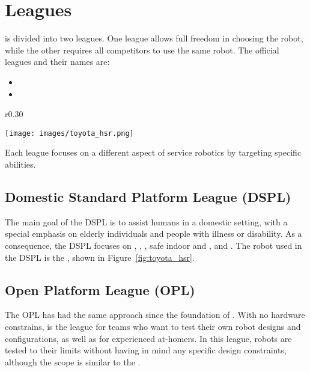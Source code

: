 \section{Leagues}\label{sec:leagues}

\AtHome{} is divided into two leagues. One league allows full freedom in choosing the robot, while the other requires all competitors to use the same robot. The official leagues and their names are:
\begin{itemize}
  \item \OPL
  \item \DSPL
\end{itemize}

\begin{wrapfigure}[21]{r}{0.30\textwidth}
	\vspace{-30pt}
	\begin{center}
		\texttt{[image: images/toyota\_hsr.png]}
		\vspace{-10pt}
		\caption{Toyota HSR}
		\label{fig:toyota_hsr}
	\end{center}
\end{wrapfigure}
Each league focuses on a different aspect of service robotics by targeting specific abilities.

\subsection{Domestic Standard Platform League (DSPL)}

The main goal of the DSPL is to assist humans in a domestic setting, with a special emphasis on elderly individuals and people with illness or disability.
As a consequence, the DSPL focuses on \AmI{}, \CV{}, \OM{}, safe indoor \NAV{} and \MAP{}, and \TP{}.
The robot used in the DSPL is the \HSR{}, shown in Figure~\ref{fig:toyota_hsr}.

\subsection{Open Platform League (OPL)}

The OPL has had the same approach since the foundation of \AtHome{}.
With no hardware constrains, \OPL{} is the league for teams who want to test their own robot designs and configurations, as well as for experienced at-homers.
In this league, robots are tested to their limits without having in mind any specific design constraints, although the scope is similar to the \DSPL{}.
